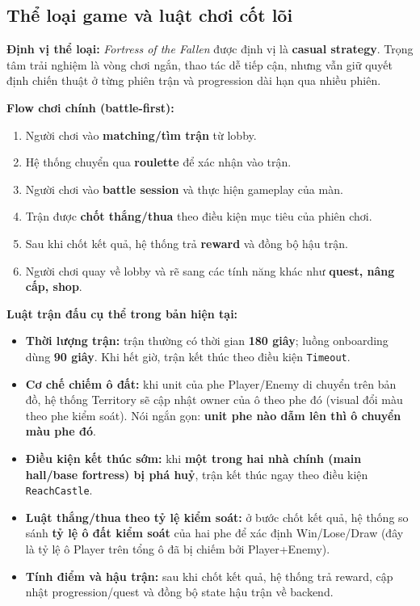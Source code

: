 \subsection{Thể loại game và luật chơi cốt lõi}

\textbf{Định vị thể loại:} \textit{Fortress of the Fallen} được định vị là \textbf{casual strategy}. Trọng tâm trải nghiệm là vòng chơi ngắn, thao tác dễ tiếp cận, nhưng vẫn giữ quyết định chiến thuật ở từng phiên trận và progression dài hạn qua nhiều phiên.

\textbf{Flow chơi chính (battle-first):}
\begin{enumerate}
    \item Người chơi vào \textbf{matching/tìm trận} từ lobby.
    \item Hệ thống chuyển qua \textbf{roulette} để xác nhận vào trận.
    \item Người chơi vào \textbf{battle session} và thực hiện gameplay của màn.
    \item Trận được \textbf{chốt thắng/thua} theo điều kiện mục tiêu của phiên chơi.
    \item Sau khi chốt kết quả, hệ thống trả \textbf{reward} và đồng bộ hậu trận.
    \item Người chơi quay về lobby và rẽ sang các tính năng khác như \textbf{quest, nâng cấp, shop}.
\end{enumerate}

\textbf{Luật trận đấu cụ thể trong bản hiện tại:}
\begin{itemize}
    \item \textbf{Thời lượng trận:} trận thường có thời gian \textbf{180 giây}; luồng onboarding dùng \textbf{90 giây}. Khi hết giờ, trận kết thúc theo điều kiện \texttt{Timeout}.
    \item \textbf{Cơ chế chiếm ô đất:} khi unit của phe Player/Enemy di chuyển trên bản đồ, hệ thống Territory sẽ cập nhật owner của ô theo phe đó (visual đổi màu theo phe kiểm soát). Nói ngắn gọn: \textbf{unit phe nào dẫm lên thì ô chuyển màu phe đó}.
    \item \textbf{Điều kiện kết thúc sớm:} khi \textbf{một trong hai nhà chính (main hall/base fortress) bị phá huỷ}, trận kết thúc ngay theo điều kiện \texttt{ReachCastle}.
    \item \textbf{Luật thắng/thua theo tỷ lệ kiểm soát:} ở bước chốt kết quả, hệ thống so sánh \textbf{tỷ lệ ô đất kiểm soát} của hai phe để xác định Win/Lose/Draw (đây là tỷ lệ ô Player trên tổng ô đã bị chiếm bởi Player+Enemy).
    \item \textbf{Tính điểm và hậu trận:} sau khi chốt kết quả, hệ thống trả reward, cập nhật progression/\allowbreak quest và đồng bộ state hậu trận về backend.
\end{itemize}

